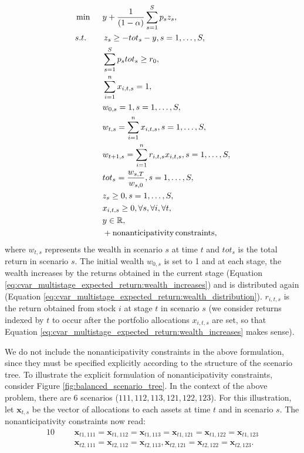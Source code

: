 \begin{alignat}{10}
& \min \, \, \, && y + \frac{1}{(1-\alpha)} \sum_{s=1}^S p_s z_s, \label{eq:cvar_multistage_expected_return}  \\
&s.t. && \, z_s \geq  -tot_s -y, s=1,\dots,S, \nonumber \\
&  && \sum_{s=1}^{S} p_s tot_s \geq r_0, \nonumber \\
&  && \sum_{i=1}^{n} x_{i,t,s} = 1, \nonumber \\
& && w_{0,s}=1, s=1,\dots,S, \nonumber \\
& && w_{t,s}=\sum_{i=1}^{n} x_{i,t,s}, s=1,\dots,S, \label{eq:cvar_multistage_expected_return:wealth_distribution} \\
& && w_{t+1,s}=\sum_{i=1}^{n} r_{i,t,s} x_{i,t,s}, s=1,\dots,S, \label{eq:cvar_multistage_expected_return:wealth_increases} \\
& && tot_s = \frac{w_{s,T}}{w_{s,0}}, s=1,\dots,S, \nonumber \\
& && z_s \geq 0, s=1,\dots,S, \nonumber \\
& && x_{i,t,s} \geq 0, \forall s, \forall i, \forall t, \nonumber \\
& && y \in \R ,\nonumber \\
& && + \mathrm{nonanticipativity \, constraints}, \nonumber
\end{alignat}
where $w_{t,s}$ represents the wealth in scenario $s$ at time $t$ and $tot_s$ is the total return in scenario $s$. The initial wealth $w_{0,s}$ is set to 1 and at each stage, the wealth increases by the returns obtained in the current stage (Equation \ref{eq:cvar_multistage_expected_return:wealth_increases}) and is distributed again (Equation \ref{eq:cvar_multistage_expected_return:wealth_distribution}). $r_{i,t,s}$ is the return obtained from stock $i$ at stage $t$ in scenario $s$ (we consider returns indexed by $t$ to occur after the portfolio allocations $x_{i,t,s}$ are set, so that Equation \ref{eq:cvar_multistage_expected_return:wealth_increases} makes sense). 

\begin{rem}
We do not include the nonanticipativity constraints in the above formulation, since they must be specified explicitly according to the structure of the scenario tree. To illustrate the explicit formulation of nonanticipativity constraints, consider Figure \ref{fig:balanced_scenario_tree}. In the context of the above problem, there are 6 scenarios ($111, 112, 113, 121, 122, 123$). For this illustration, let $\mathbf{x}_{t,s}$ be the vector of allocations to each assets at time $t$ and in scenario $s$. The nonanticipativity constraints now read:
\begin{alignat}{10}
& && \mathbf{x}_{t1,111}=\mathbf{x}_{t1,112}=\mathbf{x}_{t1,113}=\mathbf{x}_{t1,121}=\mathbf{x}_{t1,122}=\mathbf{x}_{t1,123} \nonumber \\
& && \mathbf{x}_{t2,111}=\mathbf{x}_{t2,112}=\mathbf{x}_{t2,113},\mathbf{x}_{t2,121}=\mathbf{x}_{t2,122}=\mathbf{x}_{t2,123}. \nonumber
\end{alignat}
\end{rem}

